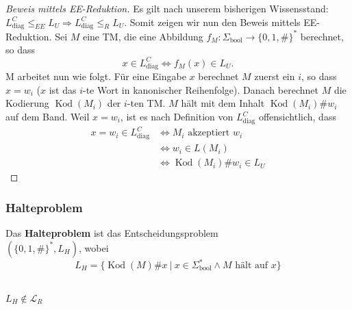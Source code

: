 \begin{proof}[Beweis mittels EE-Reduktion]
Es gilt nach unserem bisherigen Wissensstand: \( L_\text{diag}^C \leq_{EE} L_U \Rightarrow L_\text{diag}^C \leq_R L_U \). Somit zeigen wir nun den Beweis mittels EE-Reduktion. Sei \( M \) eine TM, die eine Abbildung \( f_M: \Sigma_\text{bool} \to \{0, 1, \# \}^* \) berechnet, so dass \[ x \in L_\text{diag}^C \Leftrightarrow f_M(x) \in L_U. \]
M arbeitet nun wie folgt. Für eine Eingabe \( x \) berechnet \( M \) zuerst ein \( i \), so dass \( x = w_i \) (\(x\) ist das \(i\)-te Wort in kanonischer Reihenfolge). Danach berechnet \( M \) die Kodierung \(\operatorname{Kod}(M_i)\) der \(i\)-ten TM. \( M \) hält mit dem Inhalt \(\operatorname{Kod}(M_i) \# w_i\) auf dem Band. Weil \( x = w_i \), ist es nach Definition von \( L_\text{diag}^C \) offensichtlich, dass
\begin{align*}
x = w_i \in L_\text{diag}^C &\Leftrightarrow M_i \text{ akzeptiert } w_i\\
&\Leftrightarrow w_i \in L(M_i)\\
&\Leftrightarrow \operatorname{Kod}(M_i) \# w_i \in L_U
\end{align*}

\end{proof}

\subsubsection{Halteproblem}
\begin{definition}
Das \textbf{Halteproblem} ist das Entscheidungsproblem \\
\( (\{0, 1, \#\}^*, L_H) \), wobei
\[
L_H = \{ \operatorname{Kod}(M) \# x \ |\ x \in \Sigma_\text{bool}^* \land M \text{ hält auf } x \}
\]\\
\end{definition}

\begin{satz}
\( L_H \notin \mathcal{L}_R \)\\
\end{satz}

